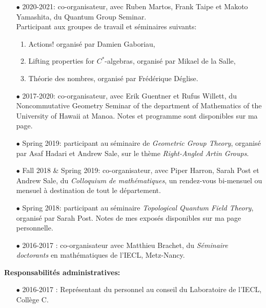 \documentclass[a4paper,11pt]{article}
\newcommand\espace{\vrule height 20pt width 0pt}
\begin{document}
\begin{itemize}
\item[$\bullet$] 2020-2021: co-organisateur, avec Ruben Martos, Frank Taipe et Makoto Yamashita, du Quantum Group Seminar.\\
Participant aux groupes de travail et séminaires suivants: 
\begin{enumerate}
\item Actions! organisé par Damien Gaboriau, 
\item Lifting properties for $C^*$-algebras, organisé par Mikael de la Salle, 
\item Théorie des nombres, organisé par Frédérique Déglise. \\
\end{enumerate}

\item[$\bullet$] 2017-2020: co-organisateur, avec Erik Guentner et Rufus Willett, du Noncommutative Geometry Seminar of the department of Mathematics of the University of Hawaii at Manoa. Notes et programme sont disponibles sur ma page.\\

\item[$\bullet$] Spring 2019: participant au s\'eminaire de \textit{Geometric Group Theory}, organis\'e par Asaf Hadari et Andrew Sale, sur le th\`eme \textit{Right-Angled Artin Groups}.  \\
\item[$\bullet$] Fall 2018 \& Spring 2019: co-organisateur, avec Piper Harron, Sarah Post et Andrew Sale, du \textit{Colloquium de math\'ematiques}, un rendez-vous bi-mensuel ou mensuel \`a destination de tout le d\'epartement. \\%
\item[$\bullet$] Spring 2018: participant au s\'eminaire \textit{Topological Quantum Field Theory}, organis\'e par Sarah Post. Notes de mes expos\'es disponibles sur ma page personnelle. \\
\item[$\bullet$] 2016-2017 : co-organisateur avec Matthieu Brachet, du \textit{S\'eminaire doctorants} en math\'ematiques de l'IECL, Metz-Nancy.
\end{itemize}

\espace

\textbf{Responsabilit\'es administratives:} \\
\begin{itemize}
\item[$\bullet$] 2016-2017 : Représentant du personnel au conseil du Laboratoire de l'IECL, Collège C.\\
\end{itemize}
\end{document}
